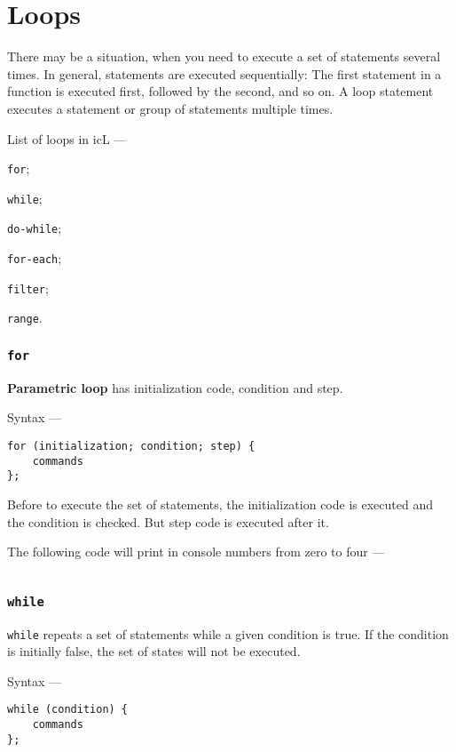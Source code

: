 \section{Loops}

There may be a situation, when you need to execute a set of statements several times. In general, statements are executed sequentially: The first statement in a function is executed first, followed by the second, and so on. A loop statement executes a statement or group of statements multiple times. 

List of loops in icL —

\begin{icItems}
\item
	\texttt{for};
\item
	\texttt{while};
\item
	\texttt{do-while};
\item
	\texttt{for-each};
\item
	\texttt{filter};
\item
	\texttt{range}.
\end{icItems}


\subsubsection{\texttt{for}}

{\bf Parametric loop} has initialization code, condition and step. 

Syntax —
\begin{verbatim}
for (initialization; condition; step) {
	commands
};
\end{verbatim}

Before to execute the set of statements, the initialization code is executed and the condition is checked. But step code is executed after it.

The following code will print in console numbers from zero to four —
\inputminted[linenos]{icl}{../sources/uniloopex.icL}

\subsubsection{\texttt{while}}

\texttt{while} repeats a set of statements while a given condition is true. If the condition is initially false, the set of states will not be executed.

Syntax —
\begin{verbatim}
while (condition) {
	commands
};
\end{verbatim}

